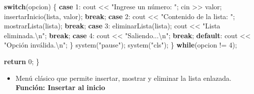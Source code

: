 \documentclass[
  11pt,
  a4paper,
  DIV=11,
  numbers=noendperiod]{scrreprt}
\newenvironment{Shaded}{\begin{snugshade}}{\end{snugshade}}
\newcommand{\ControlFlowTok}[1]{\textcolor[rgb]{0.00,0.23,0.31}{\textbf{#1}}}
\newcommand{\DecValTok}[1]{\textcolor[rgb]{0.68,0.00,0.00}{#1}}
\newcommand{\NormalTok}[1]{\textcolor[rgb]{0.00,0.23,0.31}{#1}}
\newcommand{\OperatorTok}[1]{\textcolor[rgb]{0.37,0.37,0.37}{#1}}
\newcommand{\SpecialCharTok}[1]{\textcolor[rgb]{0.37,0.37,0.37}{#1}}
\newcommand{\StringTok}[1]{\textcolor[rgb]{0.13,0.47,0.30}{#1}}
\providecommand{\tightlist}{%
  \setlength{\itemsep}{0pt}\setlength{\parskip}{0pt}}
\begin{document}
\begin{Shaded}
\begin{Highlighting}[]
        \ControlFlowTok{switch}\OperatorTok{(}\NormalTok{opcion}\OperatorTok{)} \OperatorTok{\{}
            \ControlFlowTok{case} \DecValTok{1}\OperatorTok{:}
\NormalTok{                cout }\OperatorTok{\textless{}\textless{}} \StringTok{"Ingrese un número: "}\OperatorTok{;}
\NormalTok{                cin }\OperatorTok{\textgreater{}\textgreater{}}\NormalTok{ valor}\OperatorTok{;}
\NormalTok{                insertarInicio}\OperatorTok{(}\NormalTok{lista}\OperatorTok{,}\NormalTok{ valor}\OperatorTok{);}
                \ControlFlowTok{break}\OperatorTok{;}
            \ControlFlowTok{case} \DecValTok{2}\OperatorTok{:}
\NormalTok{                cout }\OperatorTok{\textless{}\textless{}} \StringTok{"Contenido de la lista: "}\OperatorTok{;}
\NormalTok{                mostrarLista}\OperatorTok{(}\NormalTok{lista}\OperatorTok{);}
                \ControlFlowTok{break}\OperatorTok{;}
            \ControlFlowTok{case} \DecValTok{3}\OperatorTok{:}
\NormalTok{                eliminarLista}\OperatorTok{(}\NormalTok{lista}\OperatorTok{);}
\NormalTok{                cout }\OperatorTok{\textless{}\textless{}} \StringTok{"Lista eliminada.}\SpecialCharTok{\textbackslash{}n}\StringTok{"}\OperatorTok{;}
                \ControlFlowTok{break}\OperatorTok{;}
            \ControlFlowTok{case} \DecValTok{4}\OperatorTok{:}
\NormalTok{                cout }\OperatorTok{\textless{}\textless{}} \StringTok{"Saliendo...}\SpecialCharTok{\textbackslash{}n}\StringTok{"}\OperatorTok{;}
                \ControlFlowTok{break}\OperatorTok{;}
            \ControlFlowTok{default}\OperatorTok{:}
\NormalTok{                cout }\OperatorTok{\textless{}\textless{}} \StringTok{"Opción inválida.}\SpecialCharTok{\textbackslash{}n}\StringTok{"}\OperatorTok{;}
        \OperatorTok{\}}
\NormalTok{        system}\OperatorTok{(}\StringTok{"pause"}\OperatorTok{);}
\NormalTok{        system}\OperatorTok{(}\StringTok{"cls"}\OperatorTok{);}
    \OperatorTok{\}} \ControlFlowTok{while}\OperatorTok{(}\NormalTok{opcion }\OperatorTok{!=} \DecValTok{4}\OperatorTok{);}

    \ControlFlowTok{return} \DecValTok{0}\OperatorTok{;}
\OperatorTok{\}}
\end{Highlighting}
\end{Shaded}

\begin{itemize}
\tightlist
\item
  Menú clásico que permite insertar, mostrar y eliminar la lista
  enlazada. \textbf{Función: Insertar al inicio}
\end{itemize}
\end{document}

